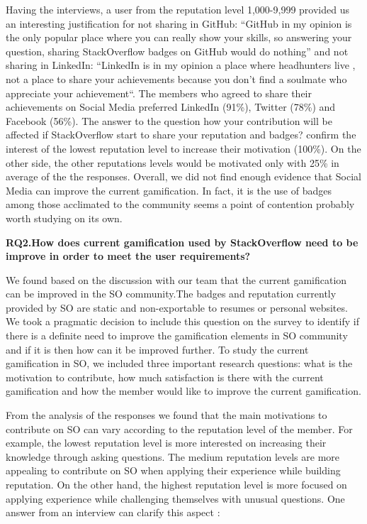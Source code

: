 \documentclass{sigchi}
\begin{document}
Having the interviews, a user from the reputation level 1,000-9,999 provided us an interesting justification for not sharing in GitHub: “GitHub in my opinion is the only popular place where you can really show your skills, so answering your question, sharing StackOverflow badges on GitHub would do nothing” and not sharing in LinkedIn: “LinkedIn is in my opinion a place where headhunters live , not a place to share your achievements because you don’t find a soulmate who appreciate your achievement“. The members who agreed to share their achievements on Social Media preferred LinkedIn (91\%), Twitter (78\%) and Facebook (56\%). The answer to the question how your contribution will be affected if StackOverflow start to share your reputation and badges? confirm the interest of the lowest reputation level to increase their motivation (100\%). On the other side, the other reputations levels would be motivated only with 25\% in average of the the responses. Overall, we did not find enough evidence that Social Media can improve the current gamification. In fact, it is the use of badges among those acclimated to the community seems a point of contention probably worth studying on its own. 

\textbf{RQ2.How does current gamification used by StackOverflow need to be improve in order to meet the user requirements?}

We found based on the discussion with our team that the current gamification can be improved in the SO community.The badges and reputation currently provided by SO are static and non-exportable to resumes or personal websites. We took a pragmatic decision to include this question on the survey to identify if there is a definite need to improve the gamification elements in SO community and if it is then how can it be improved further. To study the current gamification in SO, we included three important research questions: what is the motivation to contribute, how much satisfaction is there with the current gamification and how the member would like to improve the current gamification. 

From the analysis of the responses we found that the main motivations to contribute on SO can vary according to the reputation level of the member. For example, the lowest reputation level is more interested on increasing their knowledge through asking questions. The medium reputation levels are more appealing to contribute on SO when applying their experience while building reputation. On the other hand, the highest reputation level is more focused on applying experience while challenging themselves with unusual questions. One answer from an interview can clarify this aspect : 
\end{document}
